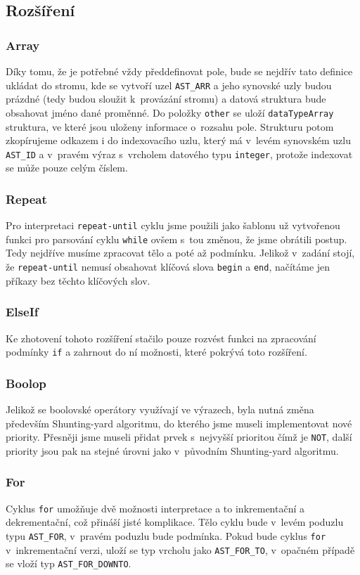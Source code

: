 \documentclass[12pt,a4paper,titlepage,final]{article}
\begin{document}
\subsection{Rozšíření}
\subsubsection{Array}
Díky tomu, že je potřebné vždy předdefinovat pole, bude se nejdřív tato definice ukládat do stromu, kde se vytvoří uzel \verb|AST_ARR| a jeho synovské uzly budou prázdné (tedy budou sloužit k~provázání stromu) a datová struktura bude obsahovat jméno dané proměnné. Do položky \verb|other| se uloží \verb|dataTypeArray| struktura, ve které jsou uloženy informace o~rozsahu pole. Strukturu potom zkopírujeme odkazem i do indexovacího uzlu, který má v~levém synovském uzlu \verb|AST_ID| a v~pravém výraz s~vrcholem datového typu \verb|integer|, protože indexovat se může pouze celým číslem.
\subsubsection{Repeat}
Pro interpretaci \verb|repeat-until| cyklu jsme použili jako šablonu už vytvořenou funkci pro parsování cyklu \verb|while| ovšem s~tou změnou, že jsme obrátili postup. Tedy nejdříve musíme zpracovat tělo a poté až podmínku. Jelikož v~zadání stojí, že \verb|repeat-until| nemusí obsahovat klíčová slova \verb|begin| a \verb|end|, načítáme jen příkazy bez těchto klíčových slov.
\subsubsection{ElseIf}
Ke zhotovení tohoto rozšíření stačilo pouze rozvést funkci na zpracování podmínky \verb|if| a zahrnout do ní možnosti, které pokrývá toto rozšíření.
\subsubsection{Boolop}
Jelikož se boolovské operátory využívají ve výrazech, byla nutná změna především Shunting-yard algoritmu, do kterého jsme museli implementovat nové priority. Přesněji jsme museli přidat prvek s~nejvyšší prioritou čímž je \verb|NOT|, další priority jsou pak na stejné úrovni jako v~původním Shunting-yard algoritmu.
\subsubsection{For}
Cyklus \verb|for| umožňuje dvě možnosti interpretace a to inkrementační a dekrementační, což přináší jisté komplikace. Tělo cyklu bude v~levém poduzlu typu \verb|AST_FOR|, v~pravém poduzlu bude podmínka. Pokud bude cyklus \verb|for| v~inkrementační verzi, uloží se typ vrcholu jako \verb|AST_FOR_TO|, v~opačném případě se vloží typ \verb|AST_FOR_DOWNTO|.
\end{document}
